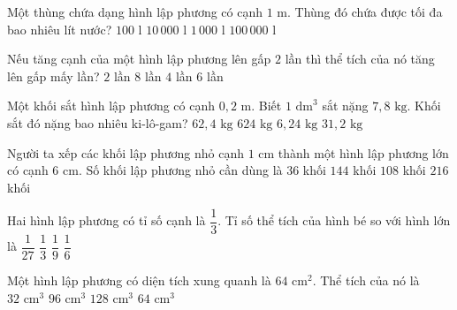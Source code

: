 \begin{ex} %
Một thùng chứa dạng hình lập phương có cạnh $1\text{ m}$. Thùng đó chứa được tối đa bao nhiêu lít nước?
\choice
{$100\text{ l}$}
{$10\,000\text{ l}$}
{\True $1\,000\text{ l}$}
{$100\,000\text{ l}$}
\end{ex}

\begin{ex} %
Nếu tăng cạnh của một hình lập phương lên gấp $2$ lần thì thể tích của nó tăng lên gấp mấy lần?
\choice
{$2$ lần}
{\True $8$ lần}
{$4$ lần}
{$6$ lần}
\end{ex}

\begin{ex} %
Một khối sắt hình lập phương có cạnh $0{,}2\text{ m}$. Biết $1\text{ dm}^3$ sắt nặng $7{,}8\text{ kg}$. Khối sắt đó nặng bao nhiêu ki-lô-gam?
\choice
{\True $62{,}4\text{ kg}$}
{$624\text{ kg}$}
{$6{,}24\text{ kg}$}
{$31{,}2\text{ kg}$}
\end{ex}

\begin{ex} %
Người ta xếp các khối lập phương nhỏ cạnh $1\text{ cm}$ thành một hình lập phương lớn có cạnh $6\text{ cm}$. Số khối lập phương nhỏ cần dùng là
\choice
{$36$ khối}
{$144$ khối}
{$108$ khối}
{\True $216$ khối}
\end{ex}

\begin{ex} %
Hai hình lập phương có tỉ số cạnh là $\dfrac{1}{3}$. Tỉ số thể tích của hình bé so với hình lớn là
\choice
{\True $\dfrac{1}{27}$}
{$\dfrac{1}{3}$}
{$\dfrac{1}{9}$}
{$\dfrac{1}{6}$}
\end{ex}

\begin{ex} %
Một hình lập phương có diện tích xung quanh là $64\text{ cm}^2$. Thể tích của nó là
\choice
{$32\text{ cm}^3$}
{$96\text{ cm}^3$}
{$128\text{ cm}^3$}
{\True $64\text{ cm}^3$}
\end{ex}

